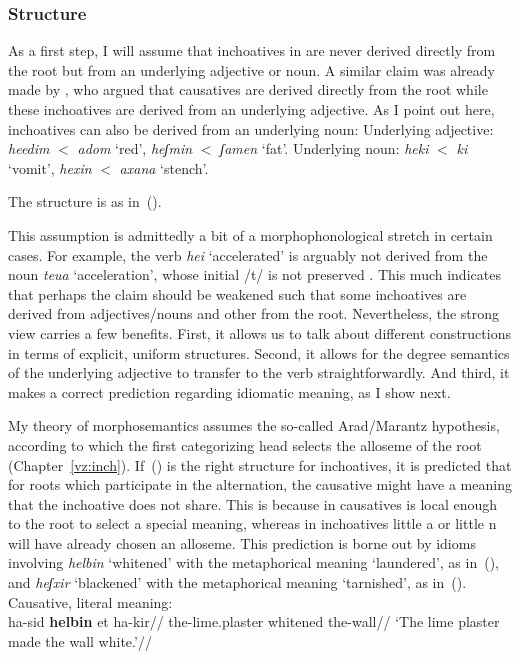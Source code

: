 		\subsubsection{Structure}
As a first step, I will assume that inchoatives in {\thif} are never derived directly from the root but from an underlying adjective or noun. A similar claim was already made by \cite{borer91}, who argued that causatives are derived directly from the root while these inchoatives are derived from an underlying adjective. As I point out here, inchoatives can also be derived from an underlying noun:
\pex
	\a Underlying adjective: \emph{heedim} $<$ \emph{adom} `red', \emph{heʃmin} $<$ \emph{ʃamen} `fat'.
	\a Underlying noun: \emph{heki} $<$ \emph{ki} `vomit', \emph{he{\texttslig}xin} $<$ \emph{{\texttslig}axana} `stench'.
\xe

The structure is as in~(\nextx).
\ex
\xe

This assumption is admittedly a bit of a morphophonological stretch in certain cases. For example, the verb \emph{hei{\texttslig}} `accelerated' is arguably not derived from the noun \emph{teu{\texttslig}a} `acceleration', whose initial /t/ is not preserved \citep{batel94,arad03}. This much indicates that perhaps the claim should be weakened such that some inchoatives are derived from adjectives/nouns and other from the root. Nevertheless, the strong view carries a few benefits. First, it allows us to talk about different constructions in terms of explicit, uniform structures. Second, it allows for the degree semantics of the underlying adjective to transfer to the verb straightforwardly. And third, it makes a correct prediction regarding idiomatic meaning, as I show next.

My theory of morphosemantics assumes the so-called Arad/Marantz hypothesis, according to which the first categorizing head selects the alloseme of the root (Chapter~\ref{vz:inch}). If~(\lastx) is the right structure for inchoatives, it is predicted that for roots which participate in the alternation, the causative might have a meaning that the inchoative does not share. This is because in causatives {\vd} is local enough to the root to select a special meaning, whereas in inchoatives little a or little n will have already chosen an alloseme. This prediction is borne out by idioms involving \emph{helbin} `whitened' with the metaphorical meaning `laundered', as in~(\nextx), and \emph{heʃxir} `blackened' with the metaphorical meaning `tarnished', as in~(\anextx).
\pex
	\a Causative, literal meaning:\\
		\begingl
			\gla ha-sid \textbf{helbin} et ha-kir//
			\glb the-lime.plaster whitened  the-wall//
			\glft `The lime plaster made the wall white.'//
		\endgl
	
